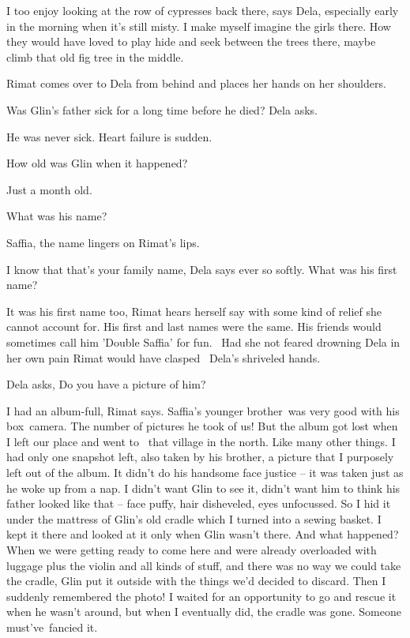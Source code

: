 \documentclass[12pt]{book}
\begin{document}
{\textquotedbl}I too enjoy looking at the row of cypresses back there,{\textquotedbl} says Dela,
{\textquotedbl}especially early in the morning when it's still misty. I make myself imagine the girls there. How they
would have loved to play hide and seek between the trees there, maybe climb that old fig tree in the
middle.{\textquotedbl}

Rimat comes over to Dela from behind and places her hands on her shoulders.

{\textquotedbl}Was Glin's father sick for a long time before he died?{\textquotedbl} Dela asks.

{\textquotedbl}He was never sick. Heart failure is sudden.{\textquotedbl}

{\textquotedbl}How old was Glin when it happened?{\textquotedbl}

{\textquotedbl}Just a month old.{\textquotedbl}

{\textquotedbl}What was his name?{\textquotedbl}

{\textquotedbl}Saffia,{\textquotedbl} the name lingers on Rimat's lips.

{\textquotedbl}I know that that's your family name,{\textquotedbl} Dela says ever so softly. {\textquotedbl}What was his
first name?{\textquotedbl}

{\textquotedbl}It was his first name too,{\textquotedbl} Rimat hears herself say with some kind of relief she cannot
account for. {\textquotedbl}His first and last names were the same. His friends would sometimes call him 'Double
Saffia' for fun.{\textquotedbl} \ Had she not feared drowning Dela in her own pain Rimat would have clasped \ Dela's
shriveled hands.

Dela asks, {\textquotedbl}Do you have a picture of him?{\textquotedbl}

{\textquotedbl}I had an album-full,{\textquotedbl} Rimat says. {\textquotedbl}Saffia's younger brother~was very good
with his box~camera. The number of pictures he took of us! But the album got lost when I left our place and went to
\ that village in the north. Like many other things. I had only one snapshot left, also taken by his brother, a picture
that I purposely left out of the album. It didn't do his handsome face justice -- it was taken just as he woke up from
a nap. I didn't want Glin to see it, didn't want him to think his father looked like that -- face puffy, hair
disheveled, eyes unfocussed. So I hid it under the mattress of Glin's old cradle which I turned into a sewing basket. I
kept it there and looked at it only when Glin wasn't there. And what happened? When we were getting ready to come here
and were already overloaded with luggage plus the violin and all kinds of stuff, and there was no way we could take the
cradle, Glin put it outside with the things we'd decided to discard. Then I suddenly remembered the photo! I waited for
an opportunity to go and rescue it when he wasn't around, but when I eventually did, the cradle was gone. Someone
must've~fancied it.{\textquotedbl}
\end{document}
